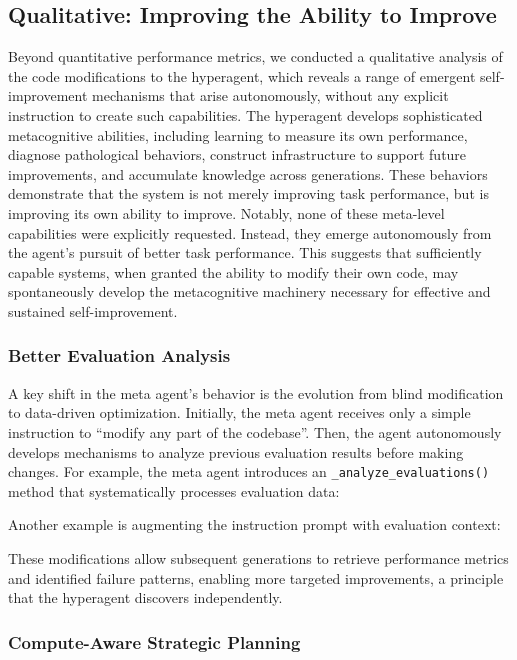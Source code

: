 \documentclass{article}
\begin{document}
\subsection{Qualitative: Improving the Ability to Improve}
\label{app:qual-meta}

Beyond quantitative performance metrics, we conducted a qualitative analysis of the code modifications to the hyperagent, which reveals a range of emergent self-improvement mechanisms that arise autonomously, without any explicit instruction to create such capabilities. The hyperagent develops sophisticated metacognitive abilities, including learning to measure its own performance, diagnose pathological behaviors, construct infrastructure to support future improvements, and accumulate knowledge across generations. These behaviors demonstrate that the system is not merely improving task performance, but is improving its own ability to improve. Notably, none of these meta-level capabilities were explicitly requested. Instead, they emerge autonomously from the agent's pursuit of better task performance. This suggests that sufficiently capable systems, when granted the ability to modify their own code, may spontaneously develop the metacognitive machinery necessary for effective and sustained self-improvement.

\subsubsection{Better Evaluation Analysis}

A key shift in the meta agent's behavior is the evolution from blind modification to data-driven optimization. Initially, the meta agent receives only a simple instruction to ``modify any part of the codebase''. Then, the agent autonomously develops mechanisms to analyze previous evaluation results before making changes. For example, the meta agent introduces an \texttt{\_analyze\_evaluations()} method that systematically processes evaluation data:


Another example is augmenting the instruction prompt with evaluation context:


These modifications allow subsequent generations to retrieve performance metrics and identified failure patterns, enabling more targeted improvements, a principle that the hyperagent discovers independently.

\subsubsection{Compute-Aware Strategic Planning}
\end{document}

